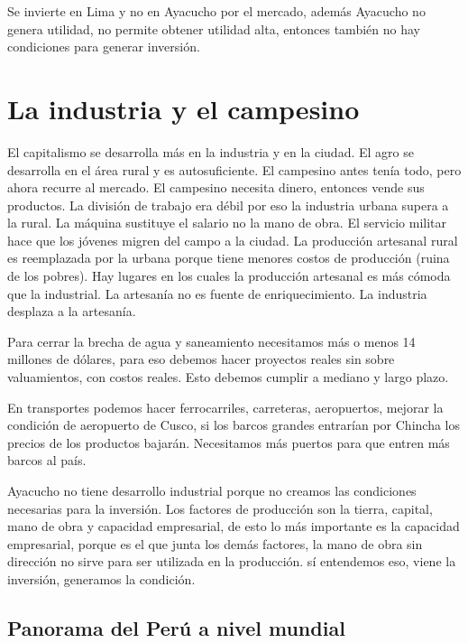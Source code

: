 \documentclass[
  letterpaper,
  DIV=11,
  numbers=noendperiod]{scrartcl}
\begin{document}
Se invierte en Lima y no en Ayacucho por el mercado, además Ayacucho no
genera utilidad, no permite obtener utilidad alta, entonces también no
hay condiciones para generar inversión.

\hypertarget{la-industria-y-el-campesino}{%
\section{La industria y el
campesino}\label{la-industria-y-el-campesino}}

El capitalismo se desarrolla más en la industria y en la ciudad. El agro
se desarrolla en el área rural y es autosuficiente. El campesino antes
tenía todo, pero ahora recurre al mercado. El campesino necesita dinero,
entonces vende sus productos. La división de trabajo era débil por eso
la industria urbana supera a la rural. La máquina sustituye el salario
no la mano de obra. El servicio militar hace que los jóvenes migren del
campo a la ciudad. La producción artesanal rural es reemplazada por la
urbana porque tiene menores costos de producción (ruina de los pobres).
Hay lugares en los cuales la producción artesanal es más cómoda que la
industrial. La artesanía no es fuente de enriquecimiento. La industria
desplaza a la artesanía.

Para cerrar la brecha de agua y saneamiento necesitamos más o menos 14
millones de dólares, para eso debemos hacer proyectos reales sin sobre
valuamientos, con costos reales. Esto debemos cumplir a mediano y largo
plazo.

En transportes podemos hacer ferrocarriles, carreteras, aeropuertos,
mejorar la condición de aeropuerto de Cusco, si los barcos grandes
entrarían por Chincha los precios de los productos bajarán. Necesitamos
más puertos para que entren más barcos al país.

Ayacucho no tiene desarrollo industrial porque no creamos las
condiciones necesarias para la inversión. Los factores de producción son
la tierra, capital, mano de obra y capacidad empresarial, de esto lo más
importante es la capacidad empresarial, porque es el que junta los demás
factores, la mano de obra sin dirección no sirve para ser utilizada en
la producción. sí entendemos eso, viene la inversión, generamos la
condición.

\hypertarget{panorama-del-peruxfa-a-nivel-mundial}{%
\subsection{Panorama del Perú a nivel
mundial}\label{panorama-del-peruxfa-a-nivel-mundial}}
\end{document}
